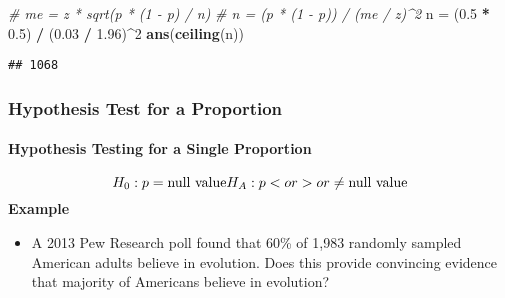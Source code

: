 \documentclass[]{book}
\newenvironment{Shaded}{\begin{snugshade}}{\end{snugshade}}
\newcommand{\CommentTok}[1]{\textcolor[rgb]{0.56,0.35,0.01}{\textit{#1}}}
\newcommand{\DecValTok}[1]{\textcolor[rgb]{0.00,0.00,0.81}{#1}}
\newcommand{\FloatTok}[1]{\textcolor[rgb]{0.00,0.00,0.81}{#1}}
\newcommand{\KeywordTok}[1]{\textcolor[rgb]{0.13,0.29,0.53}{\textbf{#1}}}
\newcommand{\NormalTok}[1]{#1}
\newcommand{\OperatorTok}[1]{\textcolor[rgb]{0.81,0.36,0.00}{\textbf{#1}}}
\newcommand{\StringTok}[1]{\textcolor[rgb]{0.31,0.60,0.02}{#1}}
\providecommand{\tightlist}{%
  \setlength{\itemsep}{0pt}\setlength{\parskip}{0pt}}
\let\oldparagraph\paragraph
\renewcommand{\paragraph}[1]{\oldparagraph{#1}\mbox{}}
\begin{document}
\begin{Shaded}
\begin{Highlighting}[]
\CommentTok{# me = z * sqrt(p * (1 - p) / n)}
\CommentTok{# n = (p * (1 - p)) / (me / z)^2}
\NormalTok{n =}\StringTok{ }\NormalTok{(}\FloatTok{0.5} \OperatorTok{*}\StringTok{ }\FloatTok{0.5}\NormalTok{) }\OperatorTok{/}\StringTok{ }\NormalTok{(}\FloatTok{0.03} \OperatorTok{/}\StringTok{ }\FloatTok{1.96}\NormalTok{)}\OperatorTok{^}\DecValTok{2}
\KeywordTok{ans}\NormalTok{(}\KeywordTok{ceiling}\NormalTok{(n))}
\end{Highlighting}
\end{Shaded}

\begin{verbatim}
## 1068
\end{verbatim}

\hypertarget{hypothesis-test-for-a-proportion}{%
\subsubsection*{Hypothesis Test for a Proportion}\label{hypothesis-test-for-a-proportion}}

\hypertarget{hypothesis-testing-for-a-single-proportion}{%
\paragraph{Hypothesis Testing for a Single Proportion}\label{hypothesis-testing-for-a-single-proportion}}

\[
H_0: p = \text{null value}\\
H_A: p < or > or\ne \text{null value}
\]
\textbf{Example}

\begin{itemize}
\tightlist
\item
  A 2013 Pew Research poll found that 60\% of 1,983 randomly sampled American adults believe in evolution. Does this provide convincing evidence that majority of Americans believe in evolution?
\end{itemize}
\end{document}
